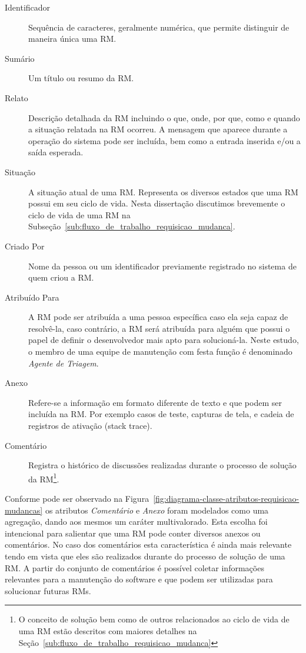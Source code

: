 \begin{description}
    \item [Identificador] Sequência de caracteres, geralmente numérica,  que
        permite distinguir de maneira única uma RM\@.
	\item [Sumário] Um título ou resumo da RM\@.
	\item [Relato] Descrição detalhada da RM incluindo o que, onde, por que,
		como e quando a situação relatada na RM ocorreu. A mensagem que aparece
		durante a operação do sistema pode ser incluída, bem como a entrada
		inserida e/ou a saída esperada.
	\item [Situação] A situação atual de uma RM\@. Representa os diversos
		estados que uma RM possui em seu ciclo de vida. Nesta dissertação
		discutimos brevemente o ciclo de vida de uma RM na
		Subseção~\ref{sub:fluxo_de_trabalho_requisicao_mudanca}.
    \item [Criado Por] Nome da pessoa ou um identificador previamente registrado
        no sistema de quem criou a RM\@.
    \item [Atribuído Para] A RM pode ser atribuída a uma pessoa específica caso
        ela seja capaz de resolvê-la, caso contrário, a RM será atribuída para
        alguém que possui o papel de definir o desenvolvedor mais apto para
        solucioná-la. Neste estudo, o membro de uma equipe de manutenção com
        festa função é denominado \textit{Agente de Triagem}.
    \item [Anexo] Refere-se a informação em formato diferente de texto e que
        podem ser incluída na RM\@. Por exemplo casos de teste, capturas de tela,
        e cadeia de registros de ativação (stack trace).
    \item [Comentário] Registra o histórico de discussões realizadas durante o
        processo de solução da RM\@\footnote{O conceito de solução bem como de
            outros relacionados ao ciclo de vida de uma RM estão descritos com
        maiores detalhes na Seção~\ref{sub:fluxo_de_trabalho_requisicao_mudanca}}.
\end{description}

Conforme pode ser observado na
Figura~\ref{fig:diagrama-classe-atributos-requisicao-mudancas} os atributos
\textit{Comentário} e \textit{Anexo} foram modelados como uma agregação, dando
aos mesmos um caráter multivalorado. Esta escolha foi intencional para
salientar que uma RM pode conter diversos anexos ou comentários. No caso dos
comentários esta característica é ainda mais relevante tendo em vista que eles
são realizados durante do processo de solução de uma RM\@. A partir do conjunto de
comentários é possível coletar informações relevantes para a manutenção do
software e que podem ser utilizadas para solucionar futuras RMs.

